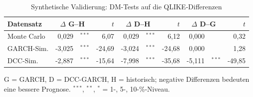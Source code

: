 \begin{table}[htbp]
  \centering
  \footnotesize
  \begin{tabular}{lr@{}lrr@{}lrr@{}lr}
    \toprule
    Datensatz & \multicolumn{2}{c}{$\Delta$ G--H} & $t$ & \multicolumn{2}{c}{$\Delta$ D--H} & $t$ & \multicolumn{2}{c}{$\Delta$ D--G} & $t$ \\
    \midrule
    Monte Carlo & 0,029 & $^{***}$ & 6,07 & 0,029 & $^{***}$ & 6,12 & 0,000 &  & 0,32 \\
    GARCH-Sim. & -3,025 & $^{***}$ & -24,69 & -3,024 & $^{***}$ & -24,68 & 0,000 &  & 1,28 \\
    DCC-Sim. & -2,887 & $^{***}$ & -15,64 & -7,998 & $^{***}$ & -35,68 & -5,111 & $^{***}$ & -49,85 \\
    \bottomrule
  \end{tabular}
  \caption{Synthetische Validierung: DM-Tests auf die QLIKE-Differenzen}
  \label{tab:synth_dmw}
  \begin{minipage}{\linewidth}\vspace{0.4em}\centering\footnotesize
  G = GARCH, D = DCC-GARCH, H = historisch; negative Differenzen bedeuten eine bessere Prognose. $^{***}$, $^{**}$, $^{*}$ = 1-, 5-, 10-\%-Niveau.
  \end{minipage}
\end{table}
